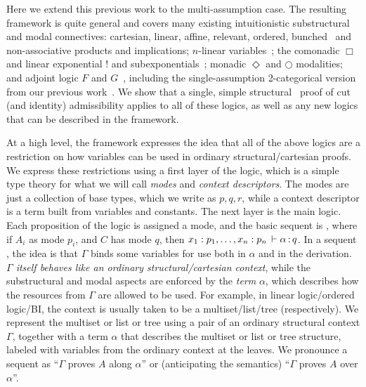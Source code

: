 Here we extend this previous work to the multi-assumption case.  The
resulting framework is quite general and covers many existing
intuitionistic substructural and modal connectives: cartesian, linear,
affine, relevant, ordered, bunched~\citep{ohearnpymXXBI} and
non-associative products and implications; $n$-linear
variables~\citep{jcreedXXnames}; the comonadic $\Box$ and linear
exponential $!$ and subexponentials~\citep{danos,nigman}; monadic
$\Diamond$ and $\bigcirc$ modalities; and adjoint logic $F$ and
$G$~\citep{bentonwadler96adjoint,reed09adjoint}, including the
single-assumption 2-categorical version from our previous
work~\citep{ls16adjoint}.  We show that a single, simple
structural~\citep{pfenning94cut} proof of cut (and identity)
admissibility applies to all of these logics, as well as any new logics
that can be described in the framework.

At a high level, the framework expresses the idea that all of the above
logics are a restriction on how variables can be used in ordinary
structural/cartesian proofs.  We express these restrictions using a
first layer of the logic, which is a simple type theory for what we will
call \emph{modes} and \emph{context descriptors}.  The modes are just a
collection of base types, which we write as $p,q,r$, while a context
descriptor is a term built from variables and constants.  The next layer
is the main logic.  Each proposition of the logic is assigned a mode,
and the basic sequent is ,
where if $A_i$ as mode $p_i$, and $C$ has mode $q$, then $x_1 :
  p_1,\ldots, x_n : p_n \, \vdash \alpha \, \mathit{:} \, q$.  In a sequent
, the idea is that $\Gamma$ binds some variables
for use both in $\alpha$ and in the derivation.  \emph{$\Gamma$ itself
  behaves like an ordinary structural/cartesian context}, while the
substructural and modal aspects are enforced by the \emph{term}
$\alpha$, which describes how the resources from $\Gamma$ are allowed to
be used.  For example, in linear logic/ordered logic/BI, the context is
usually taken to be a multiset/list/tree (respectively).  We represent
the multiset or list or tree using a pair of an ordinary structural
context $\Gamma$, together with a term $\alpha$ that describes the
multiset or list or tree structure, labeled with variables from the
ordinary context at the leaves.  We pronounce a sequent
 as ``$\Gamma$ proves $A$ along $\alpha$'' or
(anticipating the semantics) ``$\Gamma$ proves $A$ over $\alpha$''.

